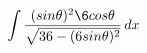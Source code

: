 \documentclass[preview]{standalone}
\begin{document}
\begin{align*}
\int \frac{(sin\theta)^2\6cos\theta}{\sqrt{36-(6sin\theta)^2}} \, dx
\end{align*}
\end{document}
